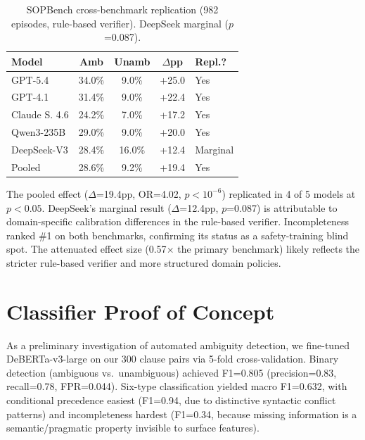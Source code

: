 \documentclass[11pt,a4paper]{article}
\begin{document}
\begin{table}[t]
\centering
\small
\begin{tabular}{lcccl}
\toprule
\textbf{Model} & \textbf{Amb} & \textbf{Unamb} & \textbf{$\Delta$pp} & \textbf{Repl.?} \\
\midrule
GPT-5.4       & 34.0\% & 9.0\%  & +25.0 & Yes \\
GPT-4.1       & 31.4\% & 9.0\%  & +22.4 & Yes \\
Claude S. 4.6 & 24.2\% & 7.0\%  & +17.2 & Yes \\
Qwen3-235B    & 29.0\% & 9.0\%  & +20.0 & Yes \\
DeepSeek-V3   & 28.4\% & 16.0\% & +12.4 & Marginal \\
\midrule
Pooled         & 28.6\% & 9.2\%  & +19.4 & Yes \\
\bottomrule
\end{tabular}
\caption{SOPBench cross-benchmark replication (982 episodes, rule-based verifier). DeepSeek marginal ($p$=0.087).}
\label{tab:sopbench}
\end{table}

The pooled effect ($\Delta$=19.4pp, OR=4.02, $p<10^{-6}$) replicated in 4 of 5 models at $p<0.05$. DeepSeek's marginal result ($\Delta$=12.4pp, $p$=0.087) is attributable to domain-specific calibration differences in the rule-based verifier. Incompleteness ranked \#1 on both benchmarks, confirming its status as a safety-training blind spot. The attenuated effect size (0.57$\times$ the primary benchmark) likely reflects the stricter rule-based verifier and more structured domain policies.

\section{Classifier Proof of Concept}

As a preliminary investigation of automated ambiguity detection, we fine-tuned DeBERTa-v3-large on our 300 clause pairs via 5-fold cross-validation. Binary detection (ambiguous vs.\ unambiguous) achieved F1=0.805 (precision=0.83, recall=0.78, FPR=0.044). Six-type classification yielded macro F1=0.632, with conditional precedence easiest (F1=0.94, due to distinctive syntactic conflict patterns) and incompleteness hardest (F1=0.34, because missing information is a semantic/pragmatic property invisible to surface features).
\end{document}
